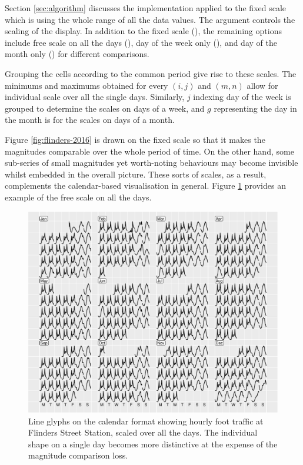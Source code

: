 \documentclass[article]{jss}
\begin{document}
Section \ref{sec:algorithm} discusses the implementation applied to the
fixed scale which is using the whole range of all the data values. The
 argument controls the scaling of the display. In addition
to the fixed scale (), the remaining options include free
scale on all the days (), day of the week only
(), and day of the month only () for
different comparisons.

Grouping the cells according to the common period give rise to these
scales. The minimums and maximums obtained for every \((i, j)\) and
\((m, n)\) allow for individual scale over all the single days.
Similarly, \(j\) indexing day of the week is grouped to determine the
scales on days of a week, and \(g\) representing the day in the month is
for the scales on days of a month.

Figure \ref{fig:flinders-2016} is drawn on the fixed scale so that it
makes the magnitudes comparable over the whole period of time. On the
other hand, some sub-series of small magnitudes yet worth-noting
behaviours may become invisible whilst embedded in the overall picture.
These sorts of scales, as a result, complements the calendar-based
visualisation in general. Figure \ref{fig:flinders-free} provides an
example of the free scale on all the days.

\begin{CodeChunk}
\begin{figure}

{\centering \includegraphics[width=\textwidth]{figure/flinders-free-1} 

}

\caption[Line glyphs on the calendar format showing hourly foot traffic at Flinders Street Station, scaled over all the days]{Line glyphs on the calendar format showing hourly foot traffic at Flinders Street Station, scaled over all the days. The individual shape on a single day becomes more distinctive at the expense of the magnitude comparison loss.}\label{fig:flinders-free}
\end{figure}
\end{CodeChunk}
\end{document}
